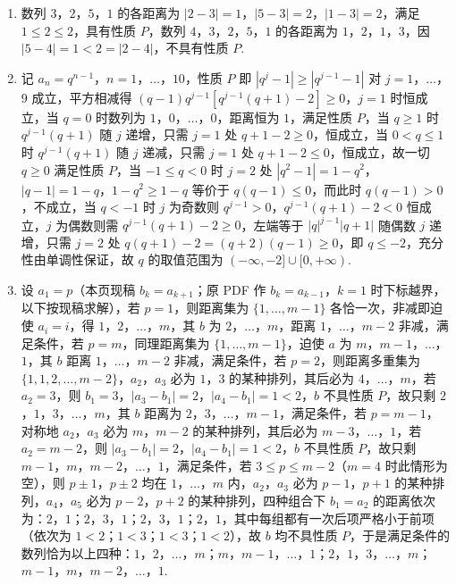 \begin{solution}
\begin{enumerate}
\item 数列 \(3\)，\(2\)，\(5\)，\(1\) 的各距离为 \(|2-3|=1\)，\(|5-3|=2\)，\(|1-3|=2\)，满足 \(1\le2\le2\)，具有性质 \(P\)，数列 \(4\)，\(3\)，\(2\)，\(5\)，\(1\) 的各距离为 \(1\)，\(2\)，\(1\)，\(3\)，因 \(|5-4|=1<2=|2-4|\)，不具有性质 \(P\).
\item 记 \(a_n=q^{n-1}\)，\(n=1\)，\(\ldots\)，\(10\)，性质 \(P\) 即 \(|q^j-1|\ge|q^{j-1}-1|\) 对 \(j=1\)，\(\ldots\)，\(9\) 成立，平方相减得 \((q-1)q^{j-1}[q^{j-1}(q+1)-2]\ge0\)，\(j=1\) 时恒成立，当 \(q=0\) 时数列为 \(1\)，\(0\)，\(\ldots\)，\(0\)，距离恒为 \(1\)，满足性质 \(P\)，当 \(q\ge1\) 时 \(q^{j-1}(q+1)\) 随 \(j\) 递增，只需 \(j=1\) 处 \(q+1-2\ge0\)，恒成立，当 \(0<q\le1\) 时 \(q^{j-1}(q+1)\) 随 \(j\) 递减，只需 \(j=1\) 处 \(q+1-2\le0\)，恒成立，故一切 \(q\ge0\) 满足性质 \(P\)，当 \(-1\le q<0\) 时 \(j=2\) 处 \(|q^2-1|=1-q^2\)，\(|q-1|=1-q\)，\(1-q^2\ge1-q\) 等价于 \(q(q-1)\le0\)，而此时 \(q(q-1)>0\)，不成立，当 \(q<-1\) 时 \(j\) 为奇数则 \(q^{j-1}>0\)，\(q^{j-1}(q+1)-2<0\) 恒成立，\(j\) 为偶数则需 \(q^{j-1}(q+1)-2\ge0\)，左端等于 \(|q|^{j-1}|q+1|\) 随偶数 \(j\) 递增，只需 \(j=2\) 处 \(q(q+1)-2=(q+2)(q-1)\ge0\)，即 \(q\le-2\)，充分性由单调性保证，故 \(q\) 的取值范围为 \((-\infty,-2]\cup[0,+\infty)\).
\item 设 \(a_1=p\)（本页现稿 \(b_k=a_{k+1}\)；原 PDF 作 \(b_k=a_{k-1}\)，\(k=1\) 时下标越界，以下按现稿求解），若 \(p=1\)，则距离集为 \(\{1,\ldots,m-1\}\) 各恰一次，非减即迫使 \(a_i=i\)，得 \(1\)，\(2\)，\(\ldots\)，\(m\)，其 \(b\) 为 \(2\)，\(\ldots\)，\(m\)，距离 \(1\)，\(\ldots\)，\(m-2\) 非减，满足条件，若 \(p=m\)，同理距离集为 \(\{1,\ldots,m-1\}\)，迫使 \(a\) 为 \(m\)，\(m-1\)，\(\ldots\)，\(1\)，其 \(b\) 距离 \(1\)，\(\ldots\)，\(m-2\) 非减，满足条件，若 \(p=2\)，则距离多重集为 \(\{1,1,2,\ldots,m-2\}\)，\(a_2\)，\(a_3\) 必为 \(1\)，\(3\) 的某种排列，其后必为 \(4\)，\(\ldots\)，\(m\)，若 \(a_2=3\)，则 \(b_1=3\)，\(|a_3-b_1|=2\)，\(|a_4-b_1|=1<2\)，\(b\) 不具性质 \(P\)，故只剩 \(2\)，\(1\)，\(3\)，\(\ldots\)，\(m\)，其 \(b\) 距离为 \(2\)，\(3\)，\(\ldots\)，\(m-1\)，满足条件，若 \(p=m-1\)，对称地 \(a_2\)，\(a_3\) 必为 \(m\)，\(m-2\) 的某种排列，其后必为 \(m-3\)，\(\ldots\)，\(1\)，若 \(a_2=m-2\)，则 \(|a_3-b_1|=2\)，\(|a_4-b_1|=1<2\)，\(b\) 不具性质 \(P\)，故只剩 \(m-1\)，\(m\)，\(m-2\)，\(\ldots\)，\(1\)，满足条件，若 \(3\le p\le m-2\)（\(m=4\) 时此情形为空），则 \(p\pm1\)，\(p\pm2\) 均在 \(1\)，\(\ldots\)，\(m\) 内，\(a_2\)，\(a_3\) 必为 \(p-1\)，\(p+1\) 的某种排列，\(a_4\)，\(a_5\) 必为 \(p-2\)，\(p+2\) 的某种排列，四种组合下 \(b_1=a_2\) 的距离依次为：\(2\)，\(1\)；\(2\)，\(3\)，\(1\)；\(2\)，\(3\)，\(1\)；\(2\)，\(1\)，其中每组都有一次后项严格小于前项（依次为 \(1<2\)；\(1<3\)；\(1<3\)；\(1<2\)），故 \(b\) 均不具性质 \(P\)，于是满足条件的数列恰为以上四种：\(1\)，\(2\)，\(\ldots\)，\(m\)；\(m\)，\(m-1\)，\(\ldots\)，\(1\)；\(2\)，\(1\)，\(3\)，\(\ldots\)，\(m\)；\(m-1\)，\(m\)，\(m-2\)，\(\ldots\)，\(1\).
\end{enumerate}
\end{solution}
